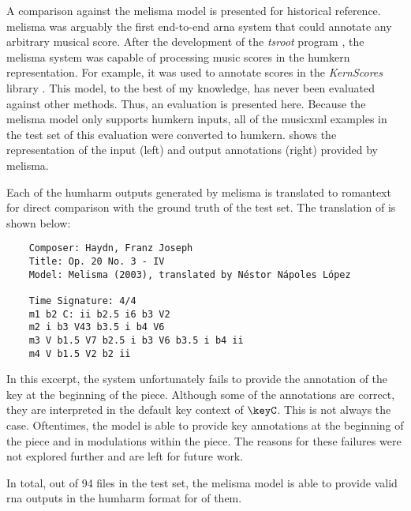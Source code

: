 
A comparison against the \gls{melisma} model is presented
for historical reference. \gls{melisma} was arguably the
first end-to-end \gls{arna} system that could annotate any
arbitrary musical score. After the development of the
\emph{tsroot} program \parencite{sapp2009tsroot}, the
\gls{melisma} system was capable of processing music scores
in the \gls{humkern} representation. For example, it was
used to annotate scores in the \emph{KernScores} library
\parencite{sapp2005online}. This model, to the best of my
knowledge, has never been evaluated against other methods.
Thus, an evaluation is presented here. Because the
\gls{melisma} model only supports \gls{humkern} inputs, all
of the \gls{musicxml} examples in the test set of this
evaluation were converted to \gls{humkern}.
 shows the representation of the
input (left) and output annotations (right) provided by
\gls{melisma}.


Each of the \gls{humharm} outputs generated by \gls{melisma}
is translated to \gls{romantext} for direct comparison with
the ground truth of the test set. The translation of
 is shown below:

\begin{verbatim}
    Composer: Haydn, Franz Joseph
    Title: Op. 20 No. 3 - IV
    Model: Melisma (2003), translated by Néstor Nápoles López
    
    Time Signature: 4/4
    m1 b2 C: ii b2.5 i6 b3 V2
    m2 i b3 V43 b3.5 i b4 V6
    m3 V b1.5 V7 b2.5 i b3 V6 b3.5 i b4 ii
    m4 V b1.5 V2 b2 ii
\end{verbatim}

In this excerpt, the system unfortunately fails to provide
the annotation of the key at the beginning of the piece.
Although some of the annotations are correct, they are
interpreted in the default key context of $\keyC$. This is
not always the case. Oftentimes, the model is able to
provide key annotations at the beginning of the piece and in
modulations within the piece. The reasons for these failures
were not explored further and are left for future work.

In total, out of 94 files in the test set, the \gls{melisma}
model is able to provide valid \gls{rna} outputs in the
\gls{humharm} format for  of them.
